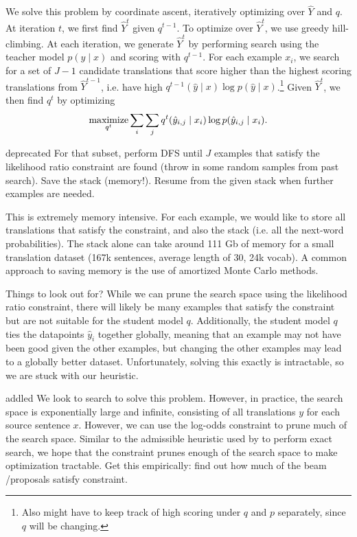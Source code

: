 \documentclass[11pt]{article}
\begin{document}
We solve this problem by coordinate ascent, iteratively optimizing over $\hat{Y}$ and $q$.
At iteration $t$, we first find $\hat{Y}^t$ given $q^{t-1}$.
To optimize over $\hat{Y}^t$, we use greedy hill-climbing.
At each iteration, we generate $\hat{Y}^t$
by performing search using the teacher model $p(y \mid x)$ and scoring with $q^{t-1}$.
For each example $x_i$, we search for a set of $J-1$ candidate translations that score higher
than the highest scoring translations from $\hat{Y}^{t-1}$,
i.e. have high $q^{t-1}(\hat{y} \mid x)\log p(\hat{y} \mid x)$.\footnote{
Also might have to keep track of high scoring under $q$ and $p$ separately,
since $q$ will be changing.
}
Given $\hat{Y}^t$, we then find $q^t$ by optimizing
\begin{equation}
    \operatorname*{maximize}_{q^t} \sum_i \sum_j q^t(\hat{y}_{i,j} \mid x_i) \log p(\hat{y}_{i,j} \mid x_i).
\end{equation}


{\color{red}deprecated}
For that subset, perform DFS until $J$ examples that satisfy the likelihood ratio constraint
are found (throw in some random samples from past search). Save the stack (memory!).
Resume from the given stack when further examples are needed.

This is extremely memory intensive. For each example,
we would like to store all translations that satisfy the constraint,
and also the stack (i.e. all the next-word probabilities).
The stack alone can take around 111 Gb of memory for a small translation dataset
(167k sentences, average length of 30, 24k vocab).
A common approach to saving memory is the use of amortized Monte Carlo methods.

Things to look out for?
While we can prune the search space using the likelihood ratio constraint,
there will likely be many examples that satisfy the constraint but are not suitable for
the student model $q$.
Additionally, the student model $q$ ties the datapoints $\hat{y}_i$ together globally,
meaning that an example may not have been good given the other examples,
but changing the other examples may lead to a globally better dataset.
Unfortunately, solving this exactly is intractable, so we are stuck with our heuristic.

{\color{red}addled}
We look to search to solve this problem.
However, in practice, the search space is exponentially large and infinite, consisting
of all translations $y$ for each source sentence $x$.
However, we can use the log-odds constraint to prune much of the search space.
Similar to the admissible heuristic used by \citet{catgotyourtongue} to perform
exact search, we hope that the constraint prunes enough of the search space to make optimization
tractable.
{\color{red}Get this empirically: find out how much of the beam /proposals satisfy constraint}.
\end{document}
